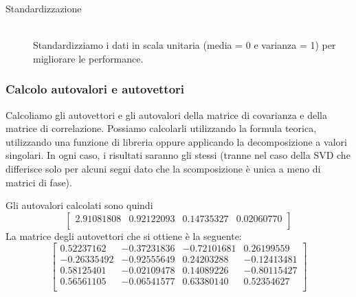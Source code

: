 \documentclass[12pt]{article}
\newcommand{\codice}[2]{}
\begin{document}
\begin{description}
				\item[Standardizzazione] \hfill \\
				Standardizziamo i dati in scala unitaria (media = 0 e varianza = 1) per migliorare le performance.
				\codice{58}{59}
			\end{description} 
		
		\subsubsection{Calcolo autovalori e autovettori}
		
			Calcoliamo gli autovettori e gli autovalori della matrice di covarianza e della matrice di correlazione. Possiamo calcolarli utilizzando la formula teorica, utilizzando una funzione di libreria oppure applicando la decomposizione a valori singolari. In ogni caso, i risultati saranno gli stessi (tranne nel caso della SVD che differisce solo per alcuni segni dato che la scomposizione è unica a meno di matrici di fase).
			\codice{61}{64}
			\codice{66}{94}
			Gli autovalori calcolati sono quindi $$\begin{bmatrix}
			2.91081808 & 0.92122093 & 0.14735327 & 0.02060770\\
			\end{bmatrix}$$
			La matrice degli autovettori che si ottiene è la seguente:
			$$\begin{bmatrix}
				0.52237162 & -0.37231836 & -0.72101681 & 0.26199559\\
				-0.26335492 & -0.92555649 & 0.24203288 & -0.12413481\\
				0.58125401 & -0.02109478 & 0.14089226 & -0.80115427\\
				0.56561105 & -0.06541577 & 0.63380140 & 0.52354627\\
			\end{bmatrix}$$
			
\end{document}
